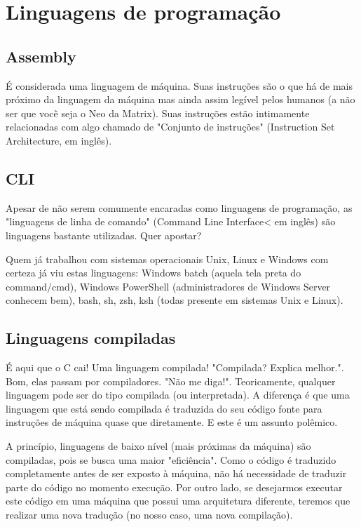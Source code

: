\section{Linguagens de programação}

\subsection{Assembly}
É considerada uma linguagem de máquina. Suas instruções são o que há de mais próximo da linguagem da máquina mas ainda assim legível pelos humanos (a não ser que você seja o Neo da Matrix). Suas instruções estão intimamente relacionadas com algo chamado de "Conjunto de instruções" (Instruction Set Architecture, em inglês).

\subsection{CLI}
Apesar de não serem comumente encaradas como linguagens de programação, as "linguagens de linha de comando" (Command Line Interface< em inglês) são linguagens bastante utilizadas. Quer apostar?

Quem já trabalhou com sistemas operacionais Unix, Linux e Windows com certeza já viu estas linguagens: Windows batch (aquela tela preta do command/cmd), Windows PowerShell (administradores de Windows Server conhecem bem), bash, sh, zsh, ksh (todas presente em sistemas Unix e Linux).

\subsection{Linguagens compiladas}
É aqui que o C cai! Uma linguagem compilada!
"Compilada? Explica melhor.". Bom, elas passam por compiladores. "Não me diga!".
Teoricamente, qualquer linguagem pode ser do tipo compilada (ou interpretada). A diferença é que uma linguagem que está sendo compilada é traduzida do seu código fonte para instruções de máquina quase que diretamente. E este é um assunto polêmico.

A princípio, linguagens de baixo nível (mais próximas da máquina) são compiladas, pois se busca uma maior "eficiência". Como o código é traduzido completamente antes de ser exposto à máquina, não há necessidade de traduzir parte do código no momento execução. Por outro lado, se desejarmos executar este código em uma máquina que possui uma arquitetura diferente, teremos que realizar uma nova tradução (no nosso caso, uma nova compilação).



